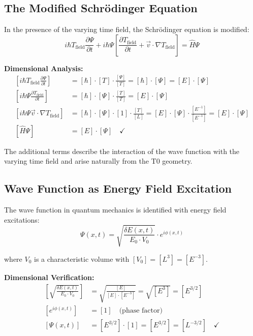 \documentclass[12pt,a4paper]{report}
\begin{document}
\subsection{The Modified Schrödinger Equation}

In the presence of the varying time field, the Schrödinger equation is modified:
\begin{equation}
	\boxed{i\hbar T_{\text{field}} \frac{\partial\Psi}{\partial t} + i\hbar\Psi\left[\frac{\partial T_{\text{field}}}{\partial t} + \vec{v} \cdot \nabla T_{\text{field}}\right] = \hat{H}\Psi}
	\label{eq:modified_schrodinger}
\end{equation}

\textbf{Dimensional Analysis:}
\begin{align}
	\left[i\hbar T_{\text{field}} \frac{\partial\Psi}{\partial t}\right] &= [\hbar] \cdot [T] \cdot \frac{[\Psi]}{[T]} = [\hbar] \cdot [\Psi] = [E] \cdot [\Psi] \\
	\left[i\hbar\Psi\frac{\partial T_{\text{field}}}{\partial t}\right] &= [\hbar] \cdot [\Psi] \cdot \frac{[T]}{[T]} = [E] \cdot [\Psi] \\
	\left[i\hbar\Psi\vec{v} \cdot \nabla T_{\text{field}}\right] &= [\hbar] \cdot [\Psi] \cdot [1] \cdot \frac{[T]}{[L]} = [E] \cdot [\Psi] \cdot \frac{[E^{-1}]}{[E^{-1}]} = [E] \cdot [\Psi] \\
	[\hat{H}\Psi] &= [E] \cdot [\Psi] \quad \checkmark
\end{align}

The additional terms describe the interaction of the wave function with the varying time field and arise naturally from the T0 geometry.

\subsection{Wave Function as Energy Field Excitation}

The wave function in quantum mechanics is identified with energy field excitations:
\begin{equation}
	\Psi(x,t) = \sqrt{\frac{\delta E(x,t)}{E_0 \cdot V_0}} \cdot e^{i\phi(x,t)}
\end{equation}

where $V_0$ is a characteristic volume with $[V_0] = [L^3] = [E^{-3}]$.

\textbf{Dimensional Verification:}
\begin{align}
	\left[\sqrt{\frac{\delta E(x,t)}{E_0 \cdot V_0}}\right] &= \sqrt{\frac{[E]}{[E] \cdot [E^{-3}]}} = \sqrt{[E^3]} = [E^{3/2}] \\
	[e^{i\phi(x,t)}] &= [1] \quad \text{(phase factor)} \\
	[\Psi(x,t)] &= [E^{3/2}] \cdot [1] = [E^{3/2}] = [L^{-3/2}] \quad \checkmark
\end{align}
\end{document}
